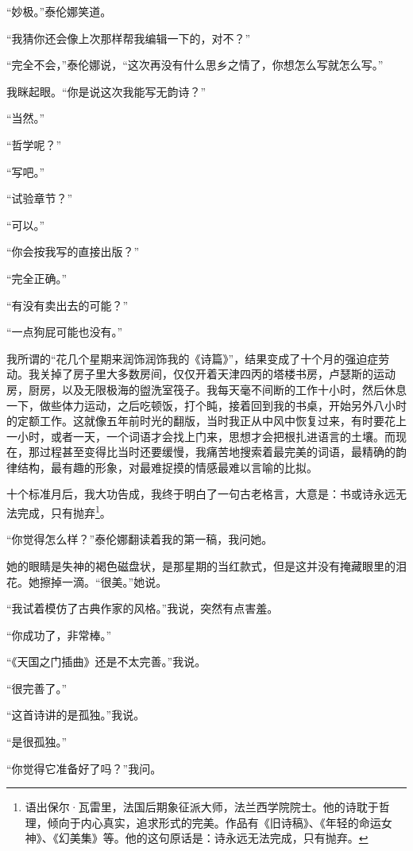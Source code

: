 \documentclass[AutoFakeBold=true]{book}
\begin{document}
``妙极。''泰伦娜笑道。

``我猜你还会像上次那样帮我编辑一下的，对不？''

``完全不会，''泰伦娜说，``这次再没有什么思乡之情了，你想怎么写就怎么写。''

我眯起眼。``你是说这次我能写无韵诗？''

``当然。''

``哲学呢？''

``写吧。''

``试验章节？''

``可以。''

``你会按我写的直接出版？''

``完全正确。''

``有没有卖出去的可能？''

``一点狗屁可能也没有。''

\vspace*{1em}

我所谓的``花几个星期来润饰润饰我的《诗篇》''，结果变成了十个月的强迫症劳动。我关掉了房子里大多数房间，仅仅开着天津四丙的塔楼书房，卢瑟斯的运动房，厨房，以及无限极海的盥洗室筏子。我每天毫不间断的工作十小时，然后休息一下，做些体力运动，之后吃顿饭，打个盹，接着回到我的书桌，开始另外八小时的定额工作。这就像五年前时光的翻版，当时我正从中风中恢复过来，有时要花上一小时，或者一天，一个词语才会找上门来，思想才会把根扎进语言的土壤。而现在，那过程甚至变得比当时还要缓慢，我痛苦地搜索着最完美的词语，最精确的韵律结构，最有趣的形象，对最难捉摸的情感最难以言喻的比拟。

十个标准月后，我大功告成，我终于明白了一句古老格言，大意是：书或诗永远无法完成，只有抛弃\footnote{语出保尔·瓦雷里，法国后期象征派大师，法兰西学院院士。他的诗耽于哲理，倾向于内心真实，追求形式的完美。作品有《旧诗稿》、《年轻的命运女神》、《幻美集》等。他的这句原话是：诗永远无法完成，只有抛弃。}。

``你觉得怎么样？''泰伦娜翻读着我的第一稿，我问她。

她的眼睛是失神的褐色磁盘状，是那星期的当红款式，但是这并没有掩藏眼里的泪花。她擦掉一滴。``很美。''她说。

``我试着模仿了古典作家的风格。''我说，突然有点害羞。

``你成功了，非常棒。''

``《天国之门插曲》还是不太完善。''我说。

``很完善了。''

``这首诗讲的是孤独。''我说。

``是很孤独。''

``你觉得它准备好了吗？''我问。
\end{document}
